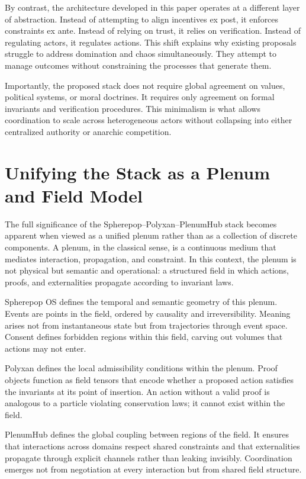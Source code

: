 \documentclass[11pt,oneside]{article}
\begin{document}
By contrast, the architecture developed in this paper operates at a different layer of abstraction. Instead of attempting to align incentives ex post, it enforces constraints ex ante. Instead of relying on trust, it relies on verification. Instead of regulating actors, it regulates actions. This shift explains why existing proposals struggle to address domination and chaos simultaneously. They attempt to manage outcomes without constraining the processes that generate them.

Importantly, the proposed stack does not require global agreement on values, political systems, or moral doctrines. It requires only agreement on formal invariants and verification procedures. This minimalism is what allows coordination to scale across heterogeneous actors without collapsing into either centralized authority or anarchic competition.

\section{Unifying the Stack as a Plenum and Field Model}

The full significance of the Spherepop–Polyxan–PlenumHub stack becomes apparent when viewed as a unified plenum rather than as a collection of discrete components. A plenum, in the classical sense, is a continuous medium that mediates interaction, propagation, and constraint. In this context, the plenum is not physical but semantic and operational: a structured field in which actions, proofs, and externalities propagate according to invariant laws.

Spherepop OS defines the temporal and semantic geometry of this plenum. Events are points in the field, ordered by causality and irreversibility. Meaning arises not from instantaneous state but from trajectories through event space. Consent defines forbidden regions within this field, carving out volumes that actions may not enter.

Polyxan defines the local admissibility conditions within the plenum. Proof objects function as field tensors that encode whether a proposed action satisfies the invariants at its point of insertion. An action without a valid proof is analogous to a particle violating conservation laws; it cannot exist within the field.

PlenumHub defines the global coupling between regions of the field. It ensures that interactions across domains respect shared constraints and that externalities propagate through explicit channels rather than leaking invisibly. Coordination emerges not from negotiation at every interaction but from shared field structure.
\end{document}
